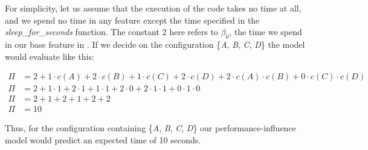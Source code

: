 For simplicity, let us assume that the execution of the code takes no time at all, and we spend no time in any feature except the time specified in the 
\textit{sleep\_for\_seconds} function.
The constant 2 here refers to $\beta_0$, the time we spend in our base feature in .
If we decide on the configuration \{\emph{A}, \emph{B}, \emph{C}, \emph{D}\} the model would evaluate like this:

\begin{align*}
    \Pi &= 2 + 1 \cdot c(A) + 2\cdot c(B) + 1\cdot c(C) + 2\cdot c(D) + 2 \cdot c(A)\cdot c(B) + 0\cdot c(C) \cdot c(D) \\
    \Pi &= 2 + 1 \cdot 1 + 2 \cdot 1 + 1 \cdot 1 + 2 \cdot 0 + 2 \cdot 1 \cdot 1 + 0 \cdot 1 \cdot 0 \\
    \Pi &= 2 + 1 + 2 + 1 + 2 + 2 \\
    \Pi &= 10
\end{align*}

Thus, for the configuration containing \{\emph{A}, \emph{B}, \emph{C}, \emph{D}\} our performance-influence model would predict an expected time of 10 seconds.
